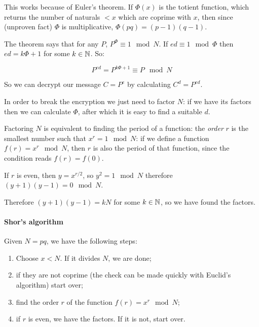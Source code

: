\documentclass[main.tex]{subfiles}
\begin{document}
\begin{bluebox}
  This works because of Euler's theorem. If \(\Phi(x)\) is the totient function, which returns the number of naturals \(< x\) which are coprime with \(x\), then since (unproven fact) \(\Phi\) is multiplicative, \(\Phi (pq) = (p-1)(q-1)\).

  The theorem says that for any \(P\), \(P^{\Phi} \equiv 1 \mod N\). If \(ed \equiv 1 \mod \Phi\) then \(ed = k \Phi + 1\) for some \(k \in \mathbb{N}\). So:

  \begin{equation}
      P^{ed} = P ^{k \Phi + 1} \equiv P \mod N
  \end{equation}

  So we can decrypt our message \(C = P^{e}\) by calculating \(C^d = P^{ed}\).
\end{bluebox}

In order to break the encryption we just need to factor \(N\): if we have its factors then we can calculate \(\Phi\), after which it is easy to find a suitable \(d\).

Factoring \( N \) is equivalent to finding the period of a function: the \emph{order} \( r \) is the smallest number such that \( x ^{r} = 1 \mod N  \): if we define a function \( f(r) = x^r \mod N \), then \(r\) is also the period of that function, since the condition reads \(f(r)=f(0)\).

If \( r \) is even, then \( y = x ^{r/2}  \), so \( y^2 = 1 \mod N \) therefore \( (y+1)(y-1) = 0 \mod N \).

Therefore \( (y+1)(y-1) = kN \) for some \( k \in \mathbb{N} \), so we have found the factors.

\paragraph{Shor's algorithm}

Given \( N = pq \), we have the following steps:

\begin{enumerate}
  \item Choose \( x<N \). If it divides \( N \), we are done;
  \item if they are not coprime (the check can be made quickly with Euclid's algorithm) start over;
  \item find the order \( r \) of the function \( f(r) = x^r \mod N \); \label{item:qft}
  \item if \( r \) is even, we have the factors. If it is not, start over.
\end{enumerate}
\end{document}
